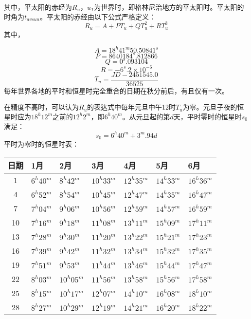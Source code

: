 其中，平太阳的赤经为$R_{u}$，$u_{T}$为世界时，即格林尼治地方的平太阳时。平太阳的时角为$t_{avsun}$。平太阳的赤经由以下公式严格定义：
\begin{equation}
	R_{u}=A+PT_{u}+QT_{u}^2+RT_{u}^3
\end{equation}
其中，

	$$A=18^h41^m50.50841^s$$
	$$P=8640184^s.812866$$
	$$Q=0^s.093104$$
	$$R=-6^s.2\times 10^{-6}$$
	$$T_{u}=\frac{JD-2451545.0}{36525}$$
每年世界各地的平时和恒星时完全重合的日期在秋分前后，有且仅有一次。

在精度不高时，可以认为$R_{u}$的表达式中每年元旦中午12时$T_{u}$为零。元旦子夜的恒星时应为$18^h12^m$之前的$12^h2^m$，即$6^h40^m$。从元旦起的第$d$天，平时零时的恒星时$s_{0}$满足：
\begin{equation}
	s_{0}=6^h40^m+3^m.94d
\end{equation}
平时为零时的恒星时表：
\begin{center}

\begin{tabularx}{\textwidth}{|c|X|X|X|X|X|X|}
	\hline
	日期&1月&2月&3月&4月&5月&6月\\
	\hline
	1&$6^h40^m$&$8^h42^m$&$10^h33^m$&$12^h35^m$&$14^h33^m$&$16^h36^m$\\
	\hline
	4&$6^h52^m$&$8^h54^m$&$10^h45^m$&$12^h47^m$&$14^h35^m$&$16^h47^m$\\
	\hline
	7&$7^h04^m$&$9^h06^m$&$10^h56^m$&$12^h59^m$&$14^h57^m$&$16^h59^m$\\
	\hline
	10&$7^h16^m$&$9^h18^m$&$11^h08^m$&$13^h11^m$&$15^h09^m$&$17^h11^m$\\
	\hline
	13&$7^h28^m$&$9^h30^m$&$11^h20^m$&$13^h22^m$&$15^h21^m$&$17^h23^m$\\
	\hline
	16&$7^h39^m$&$9^h42^m$&$11^h32^m$&$13^h34^m$&$15^h32^m$&$17^h35^m$\\
	\hline
	19&$7^h51^m$&$9^h53^m$&$11^h44^m$&$13^h46^m$&$15^h44^m$&$17^h47^m$\\
	\hline
	22&$8^h03^m$&$10^h05^m$&$11^h56^m$&$13^h58^m$&$15^h56^m$&$17^h58^m$\\
	\hline
	25&$8^h15^m$&$10^h17^m$&$12^h07^m$&$14^h10^m$&$16^h08^m$&$18^h10^m$\\
	\hline
	28&$8^h27^m$&$10^h29^m$&$12^h19^m$&$14^h21^m$&$16^h20^m$&$18^h22^m$\\
	\hline
\end{tabularx}
\end{center}

